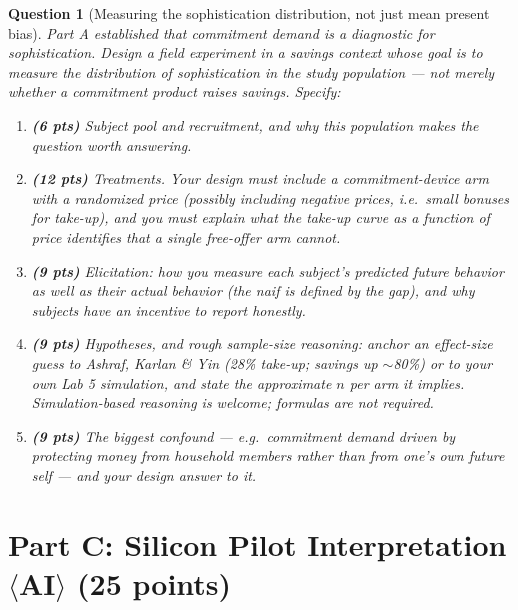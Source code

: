 \documentclass[11pt]{article}
\newtheorem{question}{Question}
\begin{document}
\begin{question}[Measuring the sophistication distribution, not just mean
present bias]
Part A established that commitment demand is a \emph{diagnostic for
sophistication}. Design a field experiment in a savings context whose goal
is to measure the \emph{distribution of sophistication} in the study
population --- not merely whether a commitment product raises savings.
Specify:
\begin{enumerate}[label=(\alph*)]
  \item \textbf{(6 pts)} Subject pool and recruitment, and why this
        population makes the question worth answering.
  \item \textbf{(12 pts)} Treatments. Your design must include a
        commitment-device arm with a \emph{randomized price} (possibly
        including negative prices, i.e.\ small bonuses for take-up), and you
        must explain what the take-up curve as a function of price
        identifies that a single free-offer arm cannot.
  \item \textbf{(9 pts)} Elicitation: how you measure each subject's
        \emph{predicted} future behavior as well as their actual behavior
        (the naif is defined by the gap), and why subjects have an incentive
        to report honestly.
  \item \textbf{(9 pts)} Hypotheses, and rough sample-size reasoning: anchor
        an effect-size guess to Ashraf, Karlan \& Yin (28\% take-up; savings
        up $\sim$80\%) or to your own Lab 5 simulation, and state the
        approximate $n$ per arm it implies. Simulation-based reasoning is
        welcome; formulas are not required.
  \item \textbf{(9 pts)} The biggest confound --- e.g.\ commitment demand
        driven by protecting money from household members rather than from
        one's own future self --- and your design answer to it.
\end{enumerate}
\end{question}

\section*{Part C: Silicon Pilot Interpretation $\langle$AI$\rangle$
(25 points)}
\end{document}
